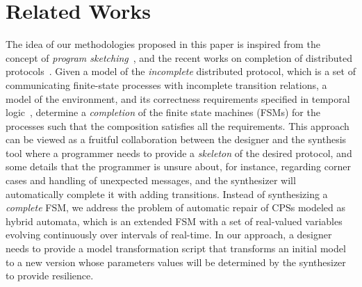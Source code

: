 \section{Related Works}
%
The idea of our methodologies proposed in this paper is inspired from the concept of \emph{program sketching}~\cite{solar2013program,solar2005programming}, and the recent works on completion of distributed protocols~\cite{alur2017automatic, alur2015automatic, alur2014synthesizing}. Given a model of the \emph{incomplete} distributed protocol, which is a set of communicating finite-state processes with incomplete transition relations, a model of the environment, and its correctness requirements specified in temporal logic~\cite{clarke2000model}, determine a \emph{completion} of the finite state machines (FSMs) for the processes such that the composition satisfies all the requirements. This approach can be viewed as a fruitful collaboration between the designer and the synthesis tool where a programmer needs to provide a \emph{skeleton} of the desired protocol, and some details that the programmer is unsure about, for instance, regarding corner cases and handling of unexpected messages, and the synthesizer will automatically complete it with adding transitions.
%
%
Instead of synthesizing a \emph{complete} FSM, we address the problem of automatic repair of CPSs modeled as hybrid automata, which is an extended FSM with a set of real-valued variables evolving continuously over intervals of real-time.  
%
%
%
In our approach, a designer needs to provide a model transformation script that transforms an initial model to a new version whose parameters values will be determined by the synthesizer to provide resilience. 
%

